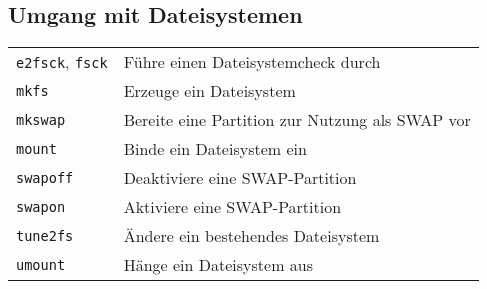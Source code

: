 \documentclass[10pt,a4paper]{article}
\begin{document}
\begin{multicols}{2} 
\section{Umgang mit Dateisystemen}
\begin{tabular}{ p{2.5cm} p{8.5cm} }
  \hline
  \texttt{e2fsck}, \texttt{fsck} & Führe einen Dateisystemcheck durch \\
  \rowcolor{Gray}
  \texttt{mkfs} & Erzeuge ein Dateisystem \\
  \texttt{mkswap} & Bereite eine Partition zur Nutzung als SWAP vor \\
  \rowcolor{Gray}
  \texttt{mount} & Binde ein Dateisystem ein \\
  \texttt{swapoff} & Deaktiviere eine SWAP-Partition \\
  \rowcolor{Gray}
  \texttt{swapon} & Aktiviere eine SWAP-Partition \\
  \texttt{tune2fs} & Ändere ein bestehendes Dateisystem \\
  \rowcolor{Gray}
  \texttt{umount} & Hänge ein Dateisystem aus \\
  \hline
\end{tabular}

~ \\


\end{multicols}
\end{document}
